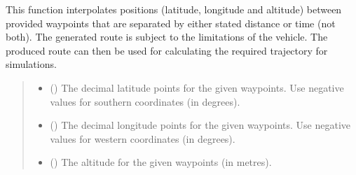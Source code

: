 \documentclass[letterpaper,10pt,english]{sphinxmanual}
\begin{document}
\begin{fulllineitems}
\label{\detokenize{modules/waypoints/generation:qnav.waypoints.generation.get_positions}}
\pysigstartsignatures
{}
\pysigstopsignatures
\sphinxAtStartPar
This function interpolates positions (latitude, longitude and altitude)
between provided waypoints that are separated by either stated distance or
time (not both). The generated route is subject to the limitations of the
vehicle. The produced route can then be used for calculating the
required trajectory for simulations.
\begin{quote}\begin{description}
\begin{itemize}
\item {} 
\sphinxAtStartPar
{} () \textendash{} The decimal latitude points for the given waypoints.
Use negative values for southern coordinates (in degrees).

\item {} 
\sphinxAtStartPar
{} () \textendash{} The decimal longitude points for the given waypoints.
Use negative values for western coordinates (in degrees).

\item {} 
\sphinxAtStartPar
{} () \textendash{} The altitude for the given waypoints (in metres).


\end{itemize}
\end{description}
\end{quote}
\end{fulllineitems}
\end{document}
